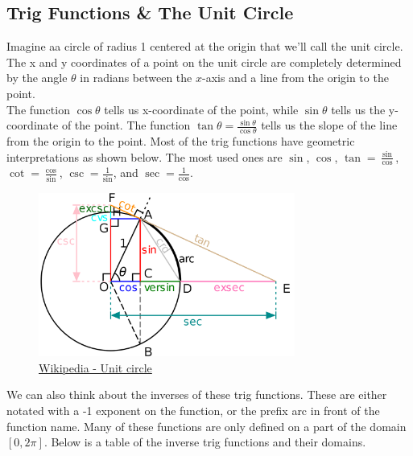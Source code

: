 \subsection{Trig Functions \& The Unit Circle}
\noindent
Imagine aa circle of radius 1 centered at the origin that we'll call the unit circle. The x and y coordinates of a point on the unit circle are completely determined by the angle $\theta$ in radians between the $x$-axis and a line from the origin to the point.\\

\noindent
The function $\cos{\theta}$ tells us x-coordinate of the point, while $\sin{\theta}$ tells us the y-coordinate of the point. The function $\tan{\theta} = \frac{\sin{\theta}}{\cos{\theta}}$ tells us the slope of the line from the origin to the point. Most of the trig functions have geometric interpretations as shown below. The most used ones are $\sin$, $\cos$, $\tan=\frac{\sin}{\cos}$, $\cot = \frac{\cos}{\sin}$, $\csc=\frac{1}{\sin}$, and $\sec=\frac{1}{\cos}$.

\begin{figure}[H]
	\label{unitCircle}
	\centering
	\includegraphics[width = 0.75\textwidth]{./backgroundReview/algebraPreCalc/unitCircle2.png}
	\caption{\hyperref{https://en.wikipedia.org/wiki/Unit_circle}{}{}{Wikipedia - Unit circle}}
\end{figure}

\noindent
We can also think about the inverses of these trig functions. These are either notated with a -1 exponent on the function, or the prefix arc in front of the function name. Many of these functions are only defined on a part of the domain $\left[0, 2\pi\right]$. Below is a table of the inverse trig functions and their domains.

